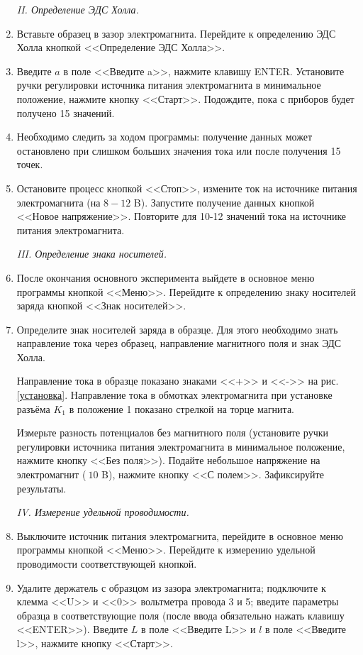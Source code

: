\documentclass[a4paper,12pt]{article} %
\begin{document}
\begin{enumerate}
\begin{center}
\textit{II. Определение ЭДС Холла.}
\end{center}   
   
  \item Вставьте образец в зазор электромагнита. Перейдите к определению ЭДС Холла кнопкой <<Определение ЭДС Холла>>.
  \item Введите $a$ в поле <<Введите a>>, нажмите клавишу ENTER. Установите ручки регулировки источника питания электромагнита в минимальное положение, нажмите кнопку <<Старт>>. Подождите, пока с приборов будет получено 15 значений.
\item Необходимо следить за ходом программы: получение данных может остановлено при слишком больших значения тока или после получения 15 точек.  
  
  \item Остановите процесс кнопкой  <<Стоп>>, измените ток на источнике питания электромагнита (на $8-12$ B). Запустите получение данных кнопкой  <<Новое напряжение>>. Повторите для 10-12 значений тока на источнике питания электромагнита.
     
\begin{center}
\textit{III. Определение знака носителей.}
\end{center}   

  \item После окончания основного эксперимента выйдете в основное меню программы кнопкой  <<Меню>>. Перейдите к определению знаку носителей заряда кнопкой <<Знак носителей>>.
  \item Определите знак носителей заряда в образце. Для этого необходимо
знать направление тока через образец, направление магнитного поля
и знак ЭДС Холла.

Направление тока в образце показано знаками  <<+>> и  <<->> на рис. \ref{установка}.
Направление тока в обмотках электромагнита при установке разъёма $K_1$ в положение 1 показано стрелкой на торце магнита. 

Измерьте разность потенциалов без магнитного поля (установите ручки регулировки источника питания электромагнита в минимальное положение, нажмите кнопку  <<Без поля>>). Подайте небольшое напряжение на электромагнит ($~10$ B), нажмите кнопку  <<С полем>>. Зафиксируйте результаты.

\begin{center}
\textit{IV. Измерение удельной проводимости.}
\end{center}  

\item Выключите источник питания электромагнита, перейдите в основное меню программы кнопкой  <<Меню>>. Перейдите к измерению удельной проводимости соответствующей кнопкой.
\item Удалите держатель с образцом из зазора электромагнита; подключите к клемма  <<U>> и  <<0>> вольтметра провода 3 и 5; введите параметры образца в соответствующие поля (после ввода обязательно нажать клавишу  <<ENTER>>). Введите $L$  в поле <<Введите L>> и $l$ в поле <<Введите l>>, нажмите кнопку  <<Старт>>.


\end{enumerate}
\end{document}
